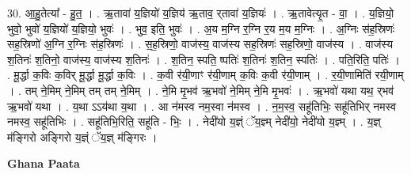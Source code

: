 \documentclass[17pt]{extarticle}
\begin{document}
30. आ॒हु॒तेत्या᳚ - हु॒त॒ । . ऋ॒तावा॑ य॒ज्ञियो॑ य॒ज्ञिय॑ ऋ॒ताव॒ र्‌तावा॑ य॒ज्ञियः॑ । . ऋ॒तावेत्यृ॒त - वा॒ । . य॒ज्ञियो॒ भुवो॒ भुवो॑ य॒ज्ञियो॑ य॒ज्ञियो॒ भुवः॑ । . भुव॒ इति॒ भुवः॑ । . अ॒य म॒ग्नि र॒ग्नि र॒य म॒य म॒ग्निः । . अ॒ग्निः स॑ह॒स्रिणः॑ सह॒स्रिणो॑ अ॒ग्नि र॒ग्निः स॑ह॒स्रिणः॑ । . स॒ह॒स्रिणो॒ वाज॑स्य॒ वाज॑स्य सह॒स्रिणः॑ सह॒स्रिणो॒ वाज॑स्य । . वाज॑स्य श॒तिनः॑ श॒तिनो॒ वाज॑स्य॒ वाज॑स्य श॒तिनः॑ । . श॒तिन॒ स्पति॒ ष्पतिः॑ श॒तिनः॑ श॒तिन॒ स्पतिः॑ । . पति॒रिति॒ पतिः॑ । . मू॒र्द्धा क॒विः क॒विर् मू॒र्द्धा मू॒र्द्धा क॒विः । . क॒वी र॑यी॒णाꣳ र॑यी॒णाम् क॒विः क॒वी र॑यी॒णाम् । . र॒यी॒णामिति॑ रयी॒णाम् । . तम् ने॒मिम् ने॒मिम् तम् तम् ने॒मिम् । . ने॒मि मृ॒भव॑ ऋ॒भवो॑ ने॒मिम् ने॒मि मृ॒भवः॑ । . ऋ॒भवो॑ यथा यथ॒ र्‌भव॑ ऋ॒भवो॑ यथा । . य॒था ऽऽय॑था य॒था । . आ न॑मस्व नम॒स्वा न॑मस्व । . न॒म॒स्व॒ सहू॑तिभिः॒ सहू॑तिभिर् नमस्व नमस्व॒ सहू॑तिभिः । . सहू॑तिभि॒रिति॒ सहू॑ति - भिः॒ । . नेदी॑यो य॒ज्ञ्ं ॅय॒ज्ञ्म् नेदी॑यो॒ नेदी॑यो य॒ज्ञ्म् । . य॒ज्ञ् म॑ङ्गिरो अङ्गिरो य॒ज्ञ्ं ॅय॒ज्ञ् म॑ङ्गिरः । \newline

\textbf{Ghana Paata } \newline
\end{document}
